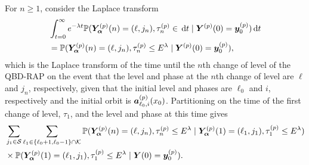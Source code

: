
For \(n\geq 1\), consider the Laplace transform 
\begin{align}
	&\int_{t=0}^\infty e^{-\lambda t} \mathbb P(\bm{Y}_{\bm{\alpha}}^{(p)}(n) = (\ell, j_n), \tau_{n}^{(p)}\in \, \mathrm{d} t
	 \mid \boldsymbol Y^{(p)}(0)=\boldsymbol y_0^{(p)}) \, \mathrm{d} t \nonumber 
	 \\&=\mathbb P(\bm{Y}_{\bm{\alpha}}^{(p)}(n) = (\ell, j_n), \tau_{n}^{(p)}\leq E^{\lambda}
	 \mid \boldsymbol Y^{(p)}(0)=\boldsymbol y_0^{(p)}),\nonumber 
\end{align}
which is the Laplace transform of the time until the \(n\)th change of level of the QBD-RAP on the event that the level and phase at the \(n\)th change of level are \(\ell\) and \(j_n\), respectively, given that the initial level and phases are \(\ell_0\) and \(i\), respectively and the initial orbit is \(\boldsymbol a_{\ell_0,i}^{(p)}(x_0)\). Partitioning on the time of the first change of level, \(\tau_1\), and the level and phase at this time gives
\begin{align}
	&\sum_{j_1\in\mathcal S}\sum_{\ell_1\in\{\ell_0+1,\ell_0-1\}\cap \mathcal K}\mathbb P(\bm{Y}_{\bm{\alpha}}^{(p)}(n) = (\ell, j_n), \tau_{n}^{(p)}\leq E^\lambda 
	 \mid \bm{Y}_{\bm{\alpha}}^{(p)}(1)=(\ell_1, j_1), \tau_1^{(p)}\leq E^\lambda ) \nonumber
	 \\&\times \mathbb P(\bm{Y}_{\bm{\alpha}}^{(p)}(1)=(\ell_1, j_1), \tau_{1}^{(p)}\leq E^\lambda
	 \mid \boldsymbol Y(0)=\boldsymbol y_0^{(p)}).
	 \label{eqn: mnebrb2}
\end{align}
